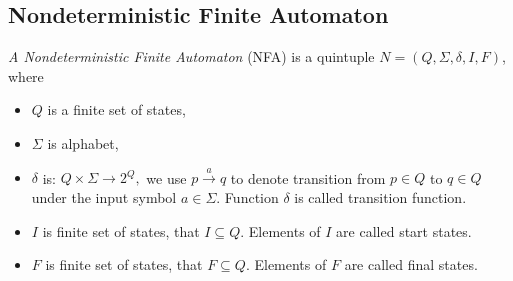 	\subsection{Nondeterministic Finite Automaton}
	\label{defNFA}
	\begin{definition}
		\emph{A Nondeterministic Finite Automaton} (NFA) is a quintuple $N=(Q,\Sigma,\delta,I,F)$, where
		\begin{itemize}
			\item $Q$ is a finite set of states,
			\item $\Sigma$ is alphabet,
			\item $\delta$ is: $Q \times \Sigma \rightarrow 2^Q,$ we use $p \xrightarrow{a} q$ to denote transition from $p \in Q$ to $q \in Q$ 
under the input symbol $a \in \Sigma$. 
Function $\delta$ is called transition function.
			\item $I$ is finite set of states, that $I \subseteq Q$. Elements of $I$ are called start states.
			\item $F$ is finite set of states, that $F \subseteq Q$. Elements of $F$ are called final states.
		\end{itemize}
	\end{definition}

